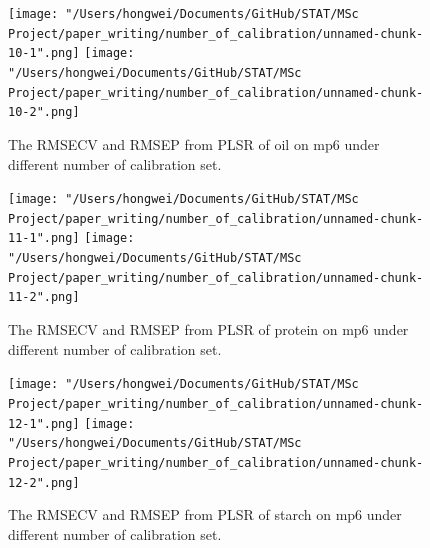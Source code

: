 \documentclass[a4paper,12pt,titlepage]{article} %
\numberwithin{equation}{section}  %
\begin{document}
\begin{appendices}
			\begin{figure}[h]    %
	\centering           %
	\texttt{[image: "/Users/hongwei/Documents/GitHub/STAT/MSc Project/paper\_writing/number\_of\_calibration/unnamed-chunk-10-1".png]}  %
	\texttt{[image: "/Users/hongwei/Documents/GitHub/STAT/MSc Project/paper\_writing/number\_of\_calibration/unnamed-chunk-10-2".png]}  %
	\caption{The RMSECV and RMSEP from PLSR of oil on mp6 under different number of calibration set.}          %
	\label{fig:calibration_10-1}               %
\end{figure}                        %



			\begin{figure}[h]    %
	\centering           %
	\texttt{[image: "/Users/hongwei/Documents/GitHub/STAT/MSc Project/paper\_writing/number\_of\_calibration/unnamed-chunk-11-1".png]}  %
	\texttt{[image: "/Users/hongwei/Documents/GitHub/STAT/MSc Project/paper\_writing/number\_of\_calibration/unnamed-chunk-11-2".png]}  %
	\caption{The RMSECV and RMSEP from PLSR of protein on mp6 under different number of calibration set.}          %
	\label{fig:calibration_11-1}               %
\end{figure}                        %


			\begin{figure}[h]    %
	\centering           %
	\texttt{[image: "/Users/hongwei/Documents/GitHub/STAT/MSc Project/paper\_writing/number\_of\_calibration/unnamed-chunk-12-1".png]}  %
	\texttt{[image: "/Users/hongwei/Documents/GitHub/STAT/MSc Project/paper\_writing/number\_of\_calibration/unnamed-chunk-12-2".png]}  %
	\caption{The RMSECV and RMSEP from PLSR of starch on mp6 under different number of calibration set.}          %
	\label{fig:calibration_12-1}               %
\end{figure}                        %
		

\end{appendices}
\end{document}
